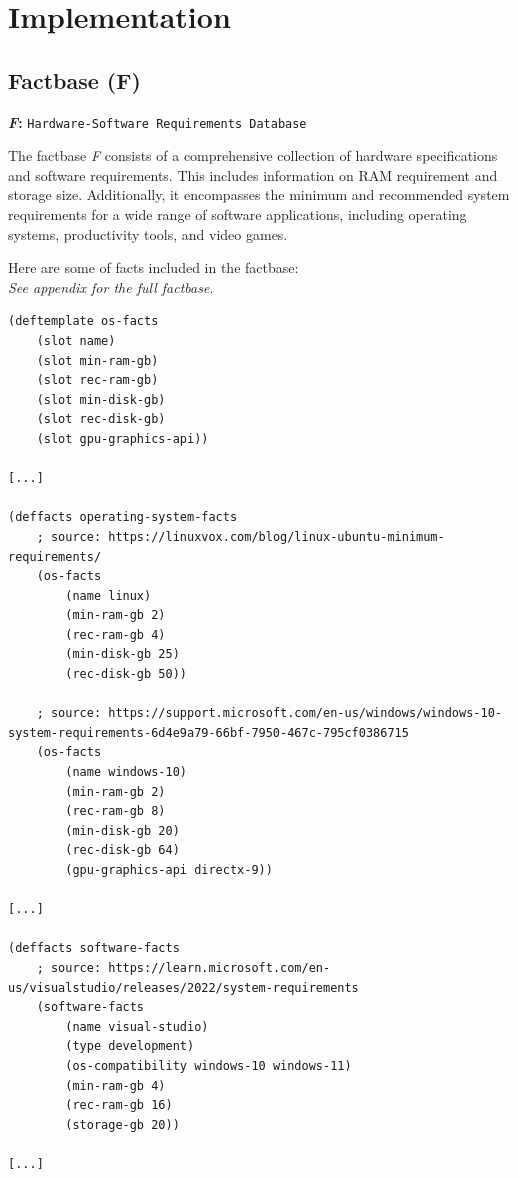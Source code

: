 \documentclass{article}
\begin{document}
\section{Implementation}


\subsection{Factbase (F)}

\textbf{\textit{F}:} \texttt{Hardware-Software Requirements Database}

The factbase \textit{F} consists of a comprehensive collection of hardware specifications and software requirements. This includes information on RAM  requirement and storage size. Additionally, it encompasses the minimum and recommended system requirements for a wide range of software applications, including operating systems, productivity tools, and video games.

Here are some of facts included in the factbase:\\
\indent\small{\it See appendix for the full factbase.}

\begin{file}
\begin{lstlisting}
(deftemplate os-facts
	(slot name)
	(slot min-ram-gb)
	(slot rec-ram-gb)
	(slot min-disk-gb)
	(slot rec-disk-gb)
    (slot gpu-graphics-api))

[...]

(deffacts operating-system-facts
	; source: https://linuxvox.com/blog/linux-ubuntu-minimum-requirements/
	(os-facts
		(name linux)
		(min-ram-gb 2)
		(rec-ram-gb 4)
		(min-disk-gb 25)
		(rec-disk-gb 50))

	; source: https://support.microsoft.com/en-us/windows/windows-10-system-requirements-6d4e9a79-66bf-7950-467c-795cf0386715
	(os-facts
		(name windows-10)
		(min-ram-gb 2)
		(rec-ram-gb 8)
		(min-disk-gb 20)
		(rec-disk-gb 64)
        (gpu-graphics-api directx-9))

[...]

(deffacts software-facts
	; source: https://learn.microsoft.com/en-us/visualstudio/releases/2022/system-requirements
	(software-facts
		(name visual-studio)
		(type development)
		(os-compatibility windows-10 windows-11)
		(min-ram-gb 4)
		(rec-ram-gb 16)
		(storage-gb 20))

[...]
\end{lstlisting}
\end{file}
\end{document}
